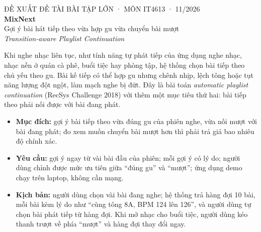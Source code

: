 \documentclass[11pt,a4paper]{article}
\newcommand{\muc}[1]{\par\vspace{0.5em}{\large\bfseries #1}\par\vspace{0.15em}}
\begin{document}
\begin{center}
  {\small ĐỀ XUẤT ĐỀ TÀI BÀI TẬP LỚN · MÔN IT4613 · 11/2026}\\[0.5em]
  {\LARGE\bfseries MixNext}\\[0.3em]
  {\large Gợi ý bài hát tiếp theo vừa hợp gu vừa chuyển bài mượt}\\[0.2em]
  {\itshape Transition-aware Playlist Continuation}
\end{center}

\muc{1. Bài toán thực tế}
Khi nghe nhạc liên tục, như tính năng tự phát tiếp của ứng dụng nghe nhạc, nhạc nền ở quán cà phê, buổi tiệc hay phòng tập,
hệ thống chọn bài tiếp theo chủ yếu theo gu. Bài kế tiếp có thể hợp gu nhưng chênh nhịp, lệch tông hoặc tụt năng lượng
đột ngột, làm mạch nghe bị đứt. Đây là bài toán \emph{automatic playlist continuation} (RecSys Challenge 2018) với thêm một
mục tiêu thứ hai: bài tiếp theo phải nối được với bài đang phát.

\begin{itemize}
  \item \textbf{Mục đích:} gợi ý bài tiếp theo vừa đúng gu của phiên nghe, vừa nối mượt với bài đang phát; đo xem muốn
        chuyển bài mượt hơn thì phải trả giá bao nhiêu độ chính xác.
  \item \textbf{Yêu cầu:} gợi ý ngay từ vài bài đầu của phiên; mỗi gợi ý có lý do; người dùng chỉnh được mức ưu tiên giữa
        “đúng gu” và “mượt”; ứng dụng demo chạy trên laptop, không cần mạng.
  \item \textbf{Kịch bản:} người dùng chọn vài bài đang nghe; hệ thống trả hàng đợi 10 bài, mỗi bài kèm lý do như
        “cùng tông 8A, BPM 124 lên 126”, và người dùng tự chọn bài phát tiếp từ hàng đợi. Khi mở nhạc cho buổi tiệc,
        người dùng kéo thanh trượt về phía “mượt” và hàng đợi thay đổi ngay.
\end{itemize}
\end{document}
